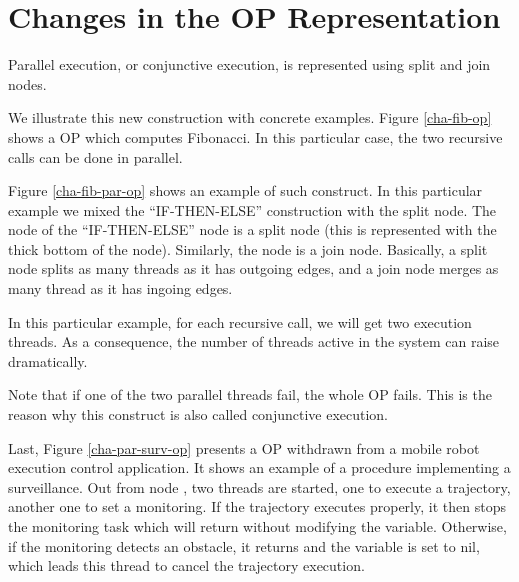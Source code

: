\section{Changes in the OP Representation}

Parallel execution, or conjunctive execution, is represented using split and
join nodes.


We illustrate this new construction with concrete examples.  Figure
\ref{cha-fib-op} shows a OP which computes Fibonacci. In this particular case,
the two recursive calls can be done in parallel.


Figure \ref{cha-fib-par-op} shows an example of such construct. In this
particular example we mixed the ``IF-THEN-ELSE'' construction with the split
node. The  node of the  ``IF-THEN-ELSE'' node is a split node
(this is represented with the thick bottom of the node). Similarly, the
 node is a join node.  Basically, a split node splits as many threads
as it has outgoing edges, and a join node merges as many thread as it has
ingoing edges.

In this particular example, for each recursive call, we will get two execution
threads. As a consequence, the number of threads active in the system can raise
dramatically. 

Note that if one of the two parallel threads fail, the whole OP fails. This is
the reason why this construct is also called conjunctive execution.

Last, Figure \ref{cha-par-surv-op} presents a OP withdrawn from a mobile robot
execution control application. It shows an example of a procedure implementing
a surveillance. Out from node , two threads are started, one to
execute a trajectory, another one to set a monitoring. If the trajectory
executes properly, it then stops the monitoring task which will return without
modifying the  variable.  Otherwise, if the monitoring detects an
obstacle, it returns and the  variable is set to nil, which leads
this thread to cancel the trajectory execution.



